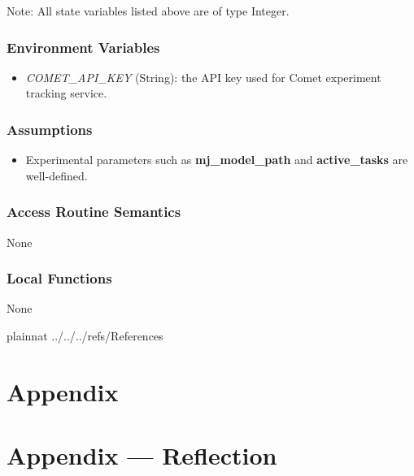 \documentclass[12pt, titlepage]{article}
\begin{document}
Note: All state variables listed above are of type Integer.

\subsubsection{Environment Variables}
\begin{itemize}
  \item \textit{COMET\_API\_KEY} (String): the API key used for Comet experiment tracking service.
\end{itemize}

\subsubsection{Assumptions}

\begin{itemize}
  \item Experimental parameters such as \textbf{mj\_model\_path} and \textbf{active\_tasks} are well-defined. 
\end{itemize}

\subsubsection{Access Routine Semantics}
None

\subsubsection{Local Functions}
None

\newpage

 {plainnat}
 {../../../refs/References}

\newpage

\section{Appendix} \label{Appendix}


\newpage{}

\section*{Appendix --- Reflection}

\end{document}
